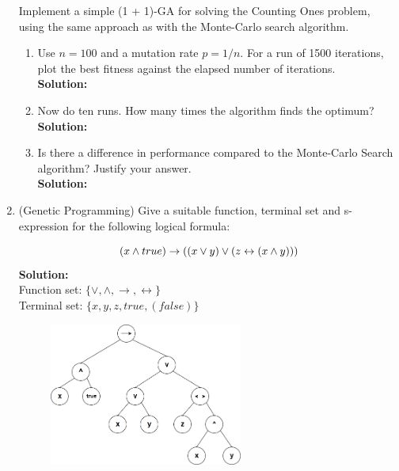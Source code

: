 \documentclass[a4paper]{article}
\begin{document}
\begin{enumerate}
	Implement a simple (1 + 1)-GA for solving the Counting Ones problem, using the same approach as with the Monte-Carlo search algorithm.
	
	\begin{enumerate}
		\item Use $n = 100$ and a mutation rate $p = 1/n$. For a run of 1500 iterations, plot the best fitness against the elapsed number of iterations.\\
		\textbf{Solution:}\\
		
		\item Now do ten runs. How many times the algorithm finds the optimum?\\
		\textbf{Solution:}\\
		
		
		\item Is there a difference in performance compared to the Monte-Carlo Search algorithm? Justify your answer.\\
		\textbf{Solution:}\\
	\end{enumerate}
	
	
	\item (Genetic Programming) Give a suitable function, terminal set and s-expression for the following logical formula:
	
	\begin{equation}
		(x \wedge true) \rightarrow ((x \vee y) \vee (z \leftrightarrow (x \wedge y))) \notag
	\end{equation}
	\textbf{Solution:}\\

	Function set: $\{\vee,\wedge,\rightarrow,\leftrightarrow\}$\\
	Terminal set: $\{x,y,z,true,(false)\}$
	\begin{figure}[ht!]
	\centering
  	\includegraphics[width=0.6\textwidth]{images/s-expression.png}
	\end{figure}


\end{enumerate}
\end{document}

